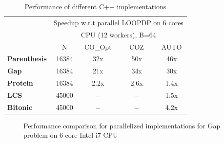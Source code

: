 \begin{table}
\centering
\begin{tabular}{|l|c|c|c|c|}
    \cline{2-5}
  \multicolumn{1}{c|}{} & \multicolumn{4}{c|}{\scriptsize Speedup w.r.t parallel LOOPDP on 6 cores}  \\
  \multicolumn{1}{c|}{} & \multicolumn{4}{c|}{\scriptsize   CPU (12 workers), B=64}  \\
  \multicolumn{1}{c|}{} & \multicolumn{1}{c|}{~~N~~} & \multicolumn{1}{c|}{CO\_Opt} & \multicolumn{1}{c|}{~~COZ~~} & \multicolumn{1}{c|}{AUTO}  \\
  \hline
  {\bf Parenthesis}  & 16384  & 32x & 50x & 46x\\
  \hline
  {\bf Gap}  & 16384 & 21x & 34x & 30x\\
  \hline
  {\bf Protein} & 16384  & 2.2x & 2.6x & 1.4x \\
  \hline
  {\bf LCS}  & 45000 & $-$ & $-$ & 1.5x \\
  \hline
  {\bf Bitonic}  & 45000  & $-$ & $-$ & 4.2x\\
  \hline
\end{tabular}
\caption{\label{evaluation:cppruntimes}
  Performance of different C++ implementations}
\end{table}

\begin{figure}
\resizebox{8cm}{!}{
}
\caption{\label{fig:gap} Performance comparison for parallelized implementations for Gap problem on 6-core Intel i7 CPU}
\end{figure}

\newcommand\isum[1]{\pgfmathparse{int(#1)}\pgfmathresult}

